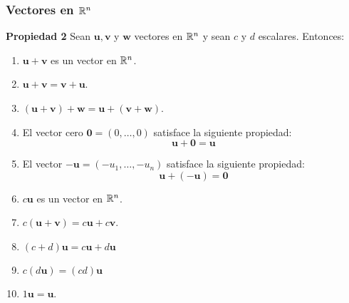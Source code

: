 {\nologo
\begin{frame}\frametitle{Vectores en $\mathbb{R}^n$}


\begin{prop}{\textbf{Propiedad 2}}
	Sean $\mathbf{u}, \mathbf{v}$ y $\mathbf{w}$ vectores en $\mathbb{R}^n$ y sean $c$ y $d$ escalares. Entonces:
	\begin{multicols}{2}		
		\begin{enumerate}			
			\justifying
			\item $\mathbf{u}+\mathbf{v}$ es un vector en $\mathbb{R}^n$. \\[4mm]			
			\item $\mathbf{u}+\mathbf{v} = \mathbf{v}+\mathbf{u}$. \\[3mm]			
			\item $(\mathbf{u}+\mathbf{v})+\mathbf{w} = \mathbf{u}+(\mathbf{v}+\mathbf{w})$. \\[4mm]			
			\item El vector cero $\mathbf{0}=(0,\hdots,0)$ satisface la siguiente propiedad:
			\[
			\mathbf{u}+\mathbf{0} = \mathbf{u}
			\]
			
			\vspace{2mm}	
			\item El vector $-\mathbf{u}=(-u_1,\hdots,-u_n)$ satisface la siguiente propiedad:
			\[
			\mathbf{u}+(-\mathbf{u}) = \mathbf{0}
			\]	
			\columnbreak
			\item $c\mathbf{u}$ es un vector en $\mathbb{R}^n$. \\[4mm]			
			\item $c(\mathbf{u}+\mathbf{v}) = c\mathbf{u} + c\mathbf{v}$. \\[3mm]
			\item $(c+d)\mathbf{u} = c\mathbf{u} + d\mathbf{u}$ \\[4mm]
			\item $c(d\mathbf{u}) = (cd)\mathbf{u}$ \\[1.3cm]
			\item $1\mathbf{u} = \mathbf{u}$.
		\end{enumerate}		
	\end{multicols}
\end{prop}

\end{frame}
}


\subsection{}

